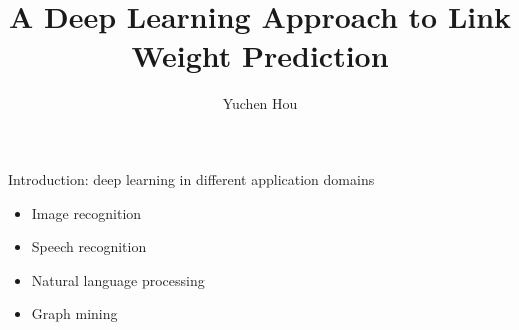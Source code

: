 \documentclass{beamer}
\title{A Deep Learning Approach to Link Weight Prediction}
\author{Yuchen Hou}
\date{}
\begin{document}

\begin{frame}{Introduction: deep learning in different application domains}
	\begin{itemize}
		\item Image recognition
		\item Speech recognition
		\item Natural language processing
		\item Graph mining
	\end{itemize}
\end{frame}
\end{document}
